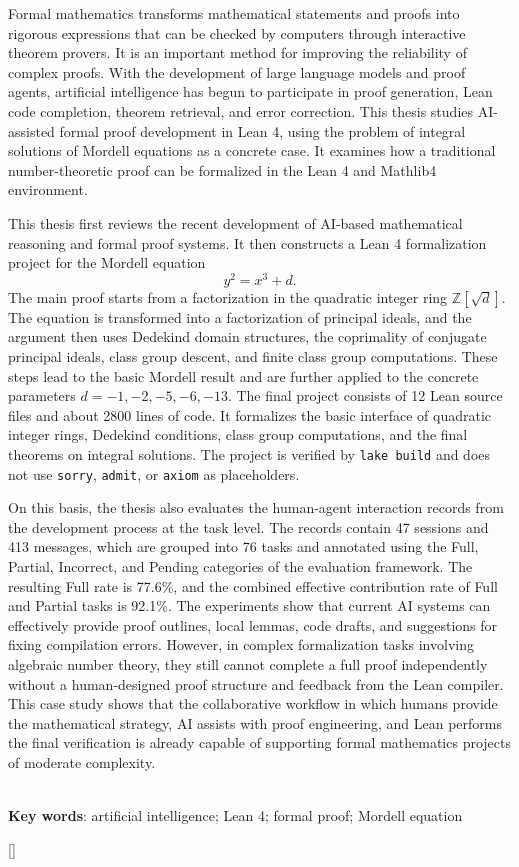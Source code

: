 Formal mathematics transforms mathematical statements and proofs into rigorous expressions that can be checked by computers through interactive theorem provers. It is an important method for improving the reliability of complex proofs. With the development of large language models and proof agents, artificial intelligence has begun to participate in proof generation, Lean code completion, theorem retrieval, and error correction. This thesis studies AI-assisted formal proof development in Lean 4, using the problem of integral solutions of Mordell equations as a concrete case. It examines how a traditional number-theoretic proof can be formalized in the Lean 4 and Mathlib4 environment.

This thesis first reviews the recent development of AI-based mathematical reasoning and formal proof systems. It then constructs a Lean 4 formalization project for the Mordell equation
\[
y^2=x^3+d.
\]
The main proof starts from a factorization in the quadratic integer ring $\mathbb{Z}[\sqrt d]$. The equation is transformed into a factorization of principal ideals, and the argument then uses Dedekind domain structures, the coprimality of conjugate principal ideals, class group descent, and finite class group computations. These steps lead to the basic Mordell result and are further applied to the concrete parameters $d=-1,-2,-5,-6,-13$. The final project consists of 12 Lean source files and about 2800 lines of code. It formalizes the basic interface of quadratic integer rings, Dedekind conditions, class group computations, and the final theorems on integral solutions. The project is verified by \texttt{lake build} and does not use \texttt{sorry}, \texttt{admit}, or \texttt{axiom} as placeholders.

On this basis, the thesis also evaluates the human-agent interaction records from the development process at the task level. The records contain 47 sessions and 413 messages, which are grouped into 76 tasks and annotated using the Full, Partial, Incorrect, and Pending categories of the evaluation framework. The resulting Full rate is 77.6\%, and the combined effective contribution rate of Full and Partial tasks is 92.1\%. The experiments show that current AI systems can effectively provide proof outlines, local lemmas, code drafts, and suggestions for fixing compilation errors. However, in complex formalization tasks involving algebraic number theory, they still cannot complete a full proof independently without a human-designed proof structure and feedback from the Lean compiler. This case study shows that the collaborative workflow in which humans provide the mathematical strategy, AI assists with proof engineering, and Lean performs the final verification is already capable of supporting formal mathematics projects of moderate complexity.

~\\
\hspace*{2em}\textbf{Key words}: artificial intelligence; Lean 4; formal proof; Mordell equation

\setmainfont{Times New Roman}
[]
